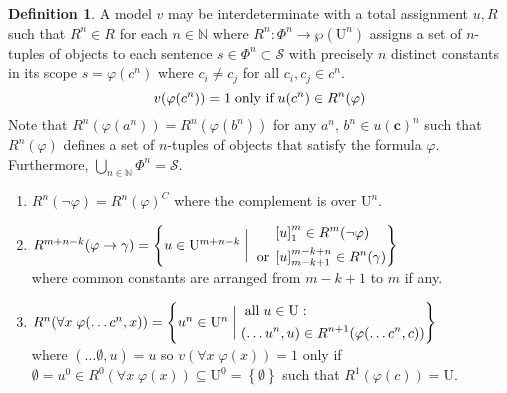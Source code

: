 \documentclass{amsbook}
\newcommand{\setsm}[1]{\left\{#1\right\}}
\newcommand{\univ}[1]{\mathord\forall#1\;}
\newcommand{\then}{\mathrel\rightarrow}
\theoremstyle{definition}
\newtheorem{dfn}{Definition}[section]
\begin{document}
\begin{dfn}
    A model $v$ may be interdeterminate with a total assignment $u, R$ such that $R^n \in R$ for each $n \in \mathbb N$ where $R^n: \Phi^n \longrightarrow \wp(\mathrm U^n)$ assigns a set of $n$-tuples of objects to each sentence $s \in \Phi^n \subset \mathcal S$ with precisely $n$ distinct constants in its scope $s = \varphi(c^n)$ where $c_i \neq c_j$ for all $c_i, c_j \in c^n$.
    $$v(\varphi(c^n)) = 1 \text{\;only if\;} u(c^n) \in R^n(\varphi)$$
    Note that $R^n(\varphi(a^n)) = R^n(\varphi(b^n))$ for any $a^n$, $b^n \in u(\mathbf c)^n$ such that $R^n(\varphi)$ defines a set of $n$-tuples of objects that satisfy the formula $\varphi$. Furthermore, $\bigcup_{n \in \mathbb N} \Phi^n = \mathcal S$.
    \begin{enumerate}
        \item $R^n(\neg\varphi) = R^n(\varphi)^C$ where the complement is over $\mathrm U^n$.

        \item $R^{m+n-k}(\varphi \then \gamma) = \setsm{u \in \mathrm U^{m+n-k} \mathrel\bigg| \begin{aligned}
                           & \left[ u \right]_1^m \in R^m(\neg\varphi)        \\
                          \text{\;or\;}
                           & \left[ u \right]_{m-k+1}^{m-k+n} \in R^n(\gamma)
                      \end{aligned} }$ \\
              where common constants are arranged from $m-k+1$ to $m$ if any.

        \item $R^n(\univ x \varphi(\dots c^n, x)) = \left\{ u^n \in \mathrm U^n \mathrel\bigg| \begin{aligned}
                       & \text{\;all\;} u \in \mathrm U : \\ &(\dots u^n, u) \in R^{n+1}(\varphi(\dots c^n, c))
                  \end{aligned}  \right\}$ \\
              where $(\dots \emptyset, u) = u$ so $v(\univ x \varphi(x)) = 1$ only if $\emptyset = u^0 \in R^0(\univ x \varphi(x)) \subseteq \mathrm U^0 = \setsm\emptyset$ such that $R^1(\varphi(c)) = \mathrm U$.
    \end{enumerate}
\end{dfn}
\end{document}
